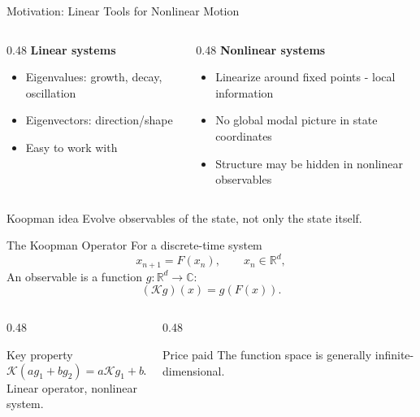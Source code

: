 \documentclass[aspectratio=169,10pt]{beamer}
\newcommand{\R}{\mathbb{R}}
\newcommand{\C}{\mathbb{C}}
\newcommand{\Koop}{\mathcal{K}}
\begin{document}
\begin{frame}{Motivation: Linear Tools for Nonlinear Motion}
    \begin{columns}[T,onlytextwidth]
        \begin{column}{0.48\textwidth}
            \textbf{Linear systems}
            \begin{itemize}
                \item Eigenvalues: growth, decay, oscillation
                \item Eigenvectors: direction/shape
                \item Easy to work with
            \end{itemize}
        \end{column}
        \begin{column}{0.48\textwidth}
            \textbf{Nonlinear systems}
            \begin{itemize}
                \item Linearize around fixed points - local information
                \item No global modal picture in state coordinates
                \item Structure may be hidden in nonlinear observables
            \end{itemize}
        \end{column}
    \end{columns}

    \vspace{0.45cm}
    \begin{block}{Koopman idea}
        Evolve observables of the state, not only the state itself.
    \end{block}
\end{frame}

\begin{frame}{The Koopman Operator}
    For a discrete-time system
    \[
        x_{n+1} = F(x_n), \qquad x_n \in \R^d,
    \]
    An observable is a function \(g:\R^d \to \C\):
    \[
        (\Koop g)(x) = g(F(x)).
    \]

    \vspace{0.25cm}
    \begin{columns}[T,onlytextwidth]
        \begin{column}{0.48\textwidth}
            \begin{block}{Key property}
                \[
                    \Koop(a g_1 + b g_2)
                    = a\Koop g_1 + b\Koop g_2.
                \]
                Linear operator, nonlinear system.
            \end{block}
        \end{column}
        \begin{column}{0.48\textwidth}
            \begin{block}{Price paid}
                The function space is generally infinite-dimensional.
            \end{block}
        \end{column}
    \end{columns}
\end{frame}
\end{document}
